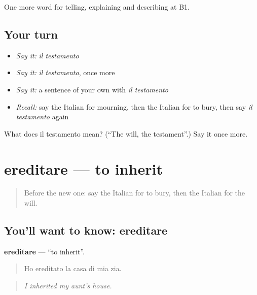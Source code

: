 \begin{grammarlens}[title={What you've built}]
One more word for telling, explaining and describing at B1.
\end{grammarlens}

\subsection*{Your turn}
\begin{itemize}
\raggedright
  \item \emph{Say it:} \emph{il testamento}
  \item \emph{Say it:} \emph{il testamento}, once more
  \item \emph{Say it:} a sentence of your own with \emph{il testamento}
  \item \emph{Recall:} say the Italian for mourning, then the Italian for to bury, then say \emph{il testamento} again
\end{itemize}

\begin{tcolorbox}[breakable,colback=teal!4,colframe=teal!35!black,title={Before you move on}]
What does il testamento mean? (\textquotedblleft{}The will, the testament\textquotedblright{}.) Say it once more.
\end{tcolorbox}
\section[ereditare]{ereditare — to inherit}

\label{lesson:IT-C314-ereditare}



\begin{quote}
Before the new one: say the Italian for to bury, then the Italian for the will.
\end{quote}

\subsection*{You'll want to know: ereditare}
\textbf{ereditare} — \textquotedblleft{}to inherit\textquotedblright{}.

\begin{quote}
Ho ereditato la casa di mia zia.
\end{quote}

\begin{quote}
\emph{I inherited my aunt's house.}
\end{quote}

